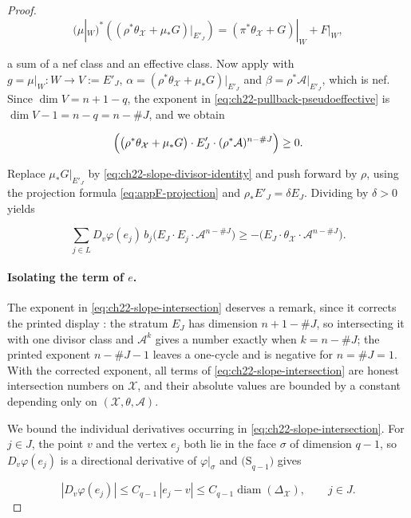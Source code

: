 \begin{proof}
\[
 (\mu|_W)^*\!\left(
   (\rho^*\theta_{\mathcal X}+\mu_*G)|_{E'_J}\right)
   =(\pi^*\theta_{\mathcal X}+G)|_W+F|_W,
\tag{22.46}\label{eq:ch22-nef-effective-decomposition}
\]

a sum of a nef class and an effective class.  Now apply
 with \(g=\mu|_W:W\to V:=E'_J\),
\(\alpha=(\rho^*\theta_{\mathcal X}+\mu_*G)|_{E'_J}\) and
\(\beta=\rho^*\mathcal A|_{E'_J}\), which is nef.  Since
\(\dim V=n+1-q\), the exponent in
\eqref{eq:ch22-pullback-pseudoeffective} is \(\dim V-1=n-q=n-\#J\), and we
obtain

\[
 \Bigl(\bigl(\rho^*\theta_{\mathcal X}+\mu_*G\bigr)\cdot E'_J\cdot
       (\rho^*\mathcal A)^{n-\#J}\Bigr)\geq0 .
\]

Replace \(\mu_*G|_{E'_J}\) by \eqref{eq:ch22-slope-divisor-identity} and
push forward by \(\rho\), using the projection formula
\eqref{eq:appF-projection} and \(\rho_*E'_J=\delta E_J\).  Dividing by
\(\delta>0\) yields

\[
 \sum_{j\in L}D_v\varphi(e_j)\,b_j
       \bigl(E_J\cdot E_j\cdot\mathcal A^{n-\#J}\bigr)
 \geq
 -\bigl(E_J\cdot\theta_{\mathcal X}\cdot
                         \mathcal A^{n-\#J}\bigr).
\tag{22.47}\label{eq:ch22-slope-intersection}
\]

\paragraph{Isolating the term of \(e\).}
The exponent in \eqref{eq:ch22-slope-intersection} deserves a remark, since
it corrects the printed display \cite[(6.3)]{BFJ16}: the stratum \(E_J\) has
dimension \(n+1-\#J\), so intersecting it with one divisor class and
\(\mathcal A^{k}\) gives a number exactly when \(k=n-\#J\); the printed
exponent \(n-\#J-1\) leaves a one-cycle and is negative for
\(n=\#J=1\).  With the corrected exponent, all terms of
\eqref{eq:ch22-slope-intersection} are honest intersection numbers on
\(\mathcal X\), and their absolute values are bounded by a constant
depending only on \((\mathcal X,\theta,\mathcal A)\).

We bound the individual derivatives occurring in
\eqref{eq:ch22-slope-intersection}.  For \(j\in J\), the point \(v\) and the
vertex \(e_j\) both lie in the face \(\sigma\) of dimension \(q-1\), so
\(D_v\varphi(e_j)\) is a directional derivative of
\(\varphi|_\sigma\) and \(\mathrm{(S}_{q-1}\mathrm{)}\) gives

\[
 |D_v\varphi(e_j)|\leq C_{q-1}\,|e_j-v|\leq C_{q-1}\operatorname{diam}
       (\Delta_{\mathcal X}),
 \qquad j\in J .
\tag{22.48}\label{eq:ch22-inductive-derivative-bound}
\]


\end{proof}
